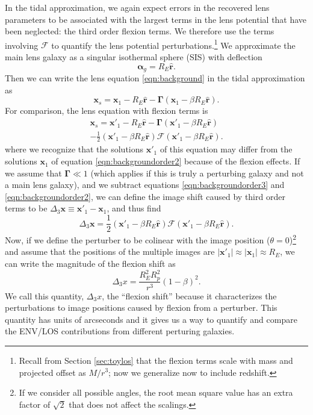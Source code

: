 \documentclass{emulateapj}
\newcommand\GammaMat[0]{\boldsymbol{\Gamma}}
\newcommand\x[0]{\mathbf{x}}
\renewcommand\vec[1]{\mathbf{#1}}
\newcommand\al[0]{\boldsymbol{\alpha}}
\newcommand\rhat[0]{\vec{\hat{r}}}
\newcommand\sF{{\mathcal F}}
\begin{document}
In the tidal approximation, we again expect errors in the recovered lens parameters to be associated with the largest terms in the lens potential that have been neglected: the third order flexion terms.  We therefore use the terms involving $\sF$ to quantify the lens potential perturbations.\footnote{Recall from Section \ref{sec:toylos} that the flexion terms scale with mass and projected offset as $M / r^3$; now we generalize now to include redshift.}  We approximate the main lens galaxy as a singular isothermal sphere (SIS) with deflection
\begin{equation}
\al_g = R_E \rhat.
\end{equation}
Then we can write the lens equation \ref{eqn:background} in the tidal approximation as
\begin{equation}
\label{eqn:backgroundorder2}
\x_s = \x_1 - R_E \rhat -  \GammaMat (\x_1 - \beta R_E \rhat).
\end{equation}
For comparison, the lens equation with flexion terms is
\begin{multline}
\x_s = \x'_1 - R_E\rhat -  \GammaMat(\x'_1 - \beta R_E\rhat) \\
- \frac{1}{2}(\x'_1 - \beta R_E\rhat) \sF (\x'_1 - \beta R_E \rhat).
\label{eqn:backgroundorder3}
\end{multline}
where we recognize that the solutions $\x'_1$ of this equation may differ from the solutions $\x_1$ of equation \ref{eqn:backgroundorder2} because of the flexion effects.  If we assume that $\GammaMat \ll 1$ (which applies if this is truly a perturbing galaxy and not a main lens galaxy), and we subtract equations \ref{eqn:backgroundorder3} and \ref{eqn:backgroundorder2}, we can define the image shift caused by third order terms to be $\Delta_3 \x \equiv \x'_1 - \x_1$, and thus find
\begin{equation}
\Delta_3 \x = \frac{1}{2} (\x'_1 - \beta R_E \rhat) \sF (\x'_1 - \beta R_E \rhat).
\end{equation}
Now, if we define the perturber to be colinear with the image position ($\theta  = 0$)\footnote{If we consider all possible angles, the root mean square value has an extra factor of $\sqrt{2}$ that does not affect the scalings.} and assume that the positions of the multiple images are $|\x'_1| \approx |\x_1| \approx R_E$, we can write the magnitude of the flexion shift as
\begin{equation}
\Delta_3 x = \frac{R_E^2 R_p^2}{r^3} (1 - \beta)^2. 
\label{eqn:backgroundd3x}
\end{equation}
We call this quantity, $\Delta_3 x$, the ``flexion shift'' because it characterizes the perturbations to image positions caused by flexion from a perturber. This quantity has units of arcseconds and it gives us a way to quantify and compare the ENV/LOS contributions from different perturing galaxies.
\end{document}
